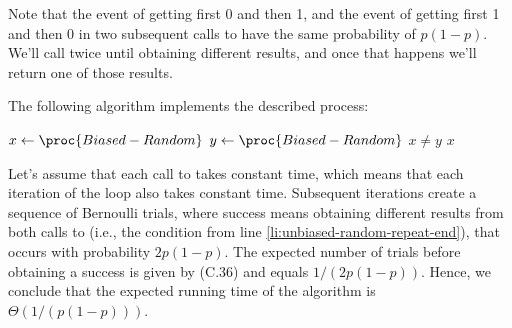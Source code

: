 \starred
Note that the event of getting first 0 and then 1, and the event of getting first 1 and then 0 in two subsequent calls to  have the same probability of $p(1-p)$.
We'll call  twice until obtaining different results, and once that happens we'll return one of those results.

The following algorithm implements the described process:

\begin{codebox}
\li \Repeat
\li     $x\gets\proc{Biased-Random}$
\li     $y\gets\proc{Biased-Random}$
\li \Until $x\ne y$ \label{li:unbiased-random-repeat-end}
\li \Return $x$
\end{codebox}

Let's assume that each call to  takes constant time, which means that each iteration of the  loop also takes constant time.
Subsequent iterations create a sequence of Bernoulli trials, where success means obtaining different results from both calls to  (i.e., the condition from line \ref{li:unbiased-random-repeat-end}), that occurs with probability $2p(1-p)$.
The expected number of trials before obtaining a success is given by (C.36) and equals $1/(2p(1-p))$.
Hence, we conclude that the expected running time of the algorithm is $\Theta(1/(p(1-p)))$.
